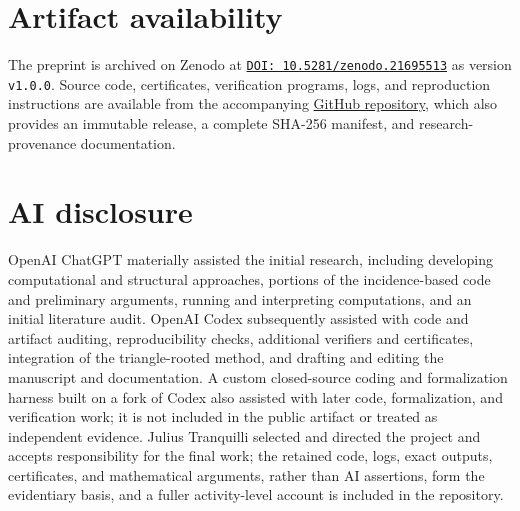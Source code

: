 \documentclass[11pt]{article}
\theoremstyle{definition}
\newcommand{\code}[1]{\texttt{#1}}
\begin{document}
\section*{Artifact availability}

The preprint is archived on Zenodo at
\href{https://doi.org/10.5281/zenodo.21695513}
{\code{DOI: 10.5281/zenodo.21695513}} as version \code{v1.0.0}. Source code,
certificates, verification programs, logs, and reproduction instructions are
available from the accompanying
\href{https://github.com/floor-licker/erdos-gyarfas-cubic-bipartite}
{GitHub repository}, which also provides an immutable release, a complete
SHA-256 manifest, and research-provenance documentation.

\section*{AI disclosure}

OpenAI ChatGPT materially assisted the initial research, including developing
computational and structural approaches, portions of the incidence-based code
and preliminary arguments, running and interpreting computations, and an
initial literature audit. OpenAI Codex subsequently assisted with code and
artifact auditing, reproducibility checks, additional verifiers and
certificates, integration of the triangle-rooted method, and drafting and
editing the manuscript and documentation. A custom closed-source coding and
formalization harness built on a fork of Codex also assisted with later code,
formalization, and verification work; it is not included in the public
artifact or treated as independent evidence. Julius Tranquilli selected and
directed the project and accepts responsibility for the final work; the
retained code, logs, exact outputs, certificates, and mathematical arguments,
rather than AI assertions, form the evidentiary basis, and a fuller
activity-level account is included in the repository.
\end{document}
